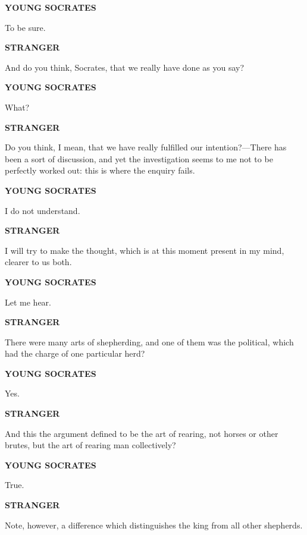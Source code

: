 \documentclass[11pt,letter]{article}
\begin{document}
\par \textbf{YOUNG SOCRATES}
\par   To be sure.

\par \textbf{STRANGER}
\par   And do you think, Socrates, that we really have done as you say?

\par \textbf{YOUNG SOCRATES}
\par   What?

\par \textbf{STRANGER}
\par   Do you think, I mean, that we have really fulfilled our intention?—There has been a sort of discussion, and yet the investigation seems to me not to be perfectly worked out:  this is where the enquiry fails.

\par \textbf{YOUNG SOCRATES}
\par   I do not understand.

\par \textbf{STRANGER}
\par   I will try to make the thought, which is at this moment present in my mind, clearer to us both.

\par \textbf{YOUNG SOCRATES}
\par   Let me hear.

\par \textbf{STRANGER}
\par   There were many arts of shepherding, and one of them was the political, which had the charge of one particular herd?

\par \textbf{YOUNG SOCRATES}
\par   Yes.

\par \textbf{STRANGER}
\par   And this the argument defined to be the art of rearing, not horses or other brutes, but the art of rearing man collectively?

\par \textbf{YOUNG SOCRATES}
\par   True.

\par \textbf{STRANGER}
\par   Note, however, a difference which distinguishes the king from all other shepherds.
\end{document}
